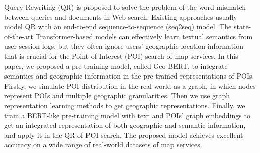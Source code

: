 Query Rewriting (QR) is proposed to solve the problem of the word mismatch between queries and documents in Web search. Existing approaches usually model QR with an end-to-end sequence-to-sequence (seq2seq) model. The state-of-the-art Transformer-based models can effectively learn textual semantics from user session logs, but they often ignore users' geographic location information that is crucial for the Point-of-Interest (POI) search of map services. In this paper, we proposed a pre-training model, called Geo-BERT, to integrate semantics and geographic information in the pre-trained representations of POIs. Firstly, we simulate POI distribution in the real world as a graph, in which nodes represent POIs and multiple geographic granularities. Then we use graph representation learning methods to get geographic representations. Finally, we train a BERT-like pre-training model with text and POIs' graph embeddings to get an integrated representation of both geographic and semantic information, and apply it in the QR of POI search. The proposed model achieves excellent accuracy on a wide range of real-world datasets of map services.

